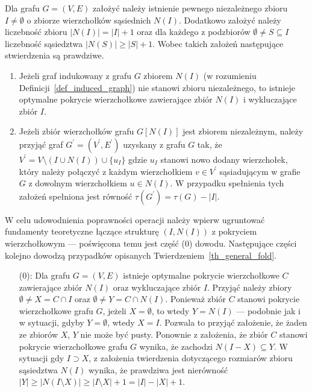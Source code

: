 \par{
  \begin{theorem}
    Dla grafu $G=(V,E)$ założyć należy istnienie pewnego niezależnego zbioru $I\neq \emptyset$ o zbiorze wierzchołków sąsiednich $N(I)$.
    Dodatkowo założyć należy liczebność zbioru $|N(I)|=|I| + 1$ oraz dla każdego z podzbiorów $\emptyset \neq S \subseteq I$ liczebność sąsiedztwa $|N(S)| \geq |S| + 1$.
    Wobec takich założeń następujące stwierdzenia są prawdziwe.
    \begin{enumerate}
      \item Jeżeli graf indukowany z grafu $G$ zbiorem $N(I)$ (w rozumieniu Definicji~\ref{def_induced_graph}) nie stanowi zbioru niezależnego, to istnieje optymalne pokrycie wierzchołkowe zawierające zbiór $N(I)$ i wykluczające zbiór $I$.
      \item Jeżeli zbiór wierzchołków grafu $G[N(I)]$ jest zbiorem niezależnym, należy przyjąć graf $G^\prime=(V^\prime, E^\prime)$ uzyskany z grafu $G$ tak, że $V^\prime=V \setminus (I \cup N(I)) \cup \{u_I\}$ gdzie $u_I$ stanowi nowo dodany wierzchołek, który należy połączyć z każdym wierzchołkiem $v \in V^\prime$ sąsiadującym w grafie $G$ z dowolnym wierzchołkiem $u \in N(I)$.
      W przypadku spełnienia tych założeń spełniona jest równość $\tau(G^\prime)=\tau(G)-|I|$.
    \end{enumerate}
  \end{theorem}
  \begin{bproof} W celu udowodnienia poprawności operacji należy wpierw ugruntować fundamenty teoretyczne łączące strukturę $(I, N(I))$ z pokryciem wierzchołkowym --- poświęcona temu jest część (0) dowodu.
    Następujące części kolejno dowodzą przypadków opisanych Twierdzeniem~\ref{th_general_fold}.
    \begin{itemize}
      \item[(0):] Dla grafu $G=(V, E)$ istnieje optymalne pokrycie wierzchołkowe $C$ zawierające zbiór $N(I)$ oraz wykluczające zbiór $I$.
      Przyjąć należy zbiory $\emptyset \neq X=C \cap I$ oraz $\emptyset \neq Y=C \cap N(I)$.
      Ponieważ zbiór $C$ stanowi pokrycie wierzchołkowe grafu $G$, jeżeli $X=\emptyset$, to wtedy $Y=N(I)$ --- podobnie jak i w sytuacji, gdyby $Y=\emptyset$, wtedy $X=I$.
      Pozwala to przyjąć założenie, że żaden ze zbiorów $X$, $Y$ nie może być pusty.
      Ponownie z założenia, że zbiór $C$ stanowi pokrycie wierzchołkowe grafu $G$ wynika, że zachodzi $N(I-X)\subseteq Y$.
      W sytuacji gdy $I \supset X$, z założenia twierdzenia dotyczącego rozmiarów zbioru sąsiedztwa $N(I)$ wynika, że prawdziwa jest nierówność $|Y| \geq |N(I \setminus X)| \geq |I \setminus X| + 1 = |I| - |X| + 1$.

\end{itemize}
\end{bproof}}
